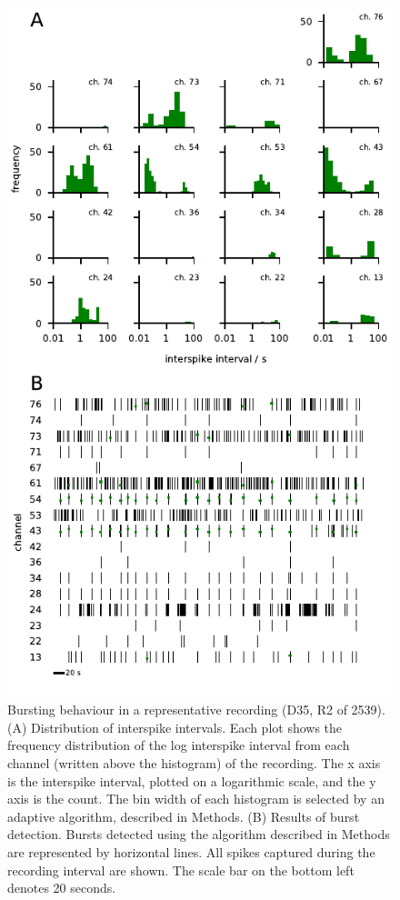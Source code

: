 \documentclass[doublespacing]{bmcart}
\begin{document}
\begin{backmatter}
\begin{figure}[h!]
  \includegraphics{../plots/supplementary_figures/isi_and_burst_example.pdf}
	\caption{Bursting behaviour in a representative recording (D35, R2 of 2539). (A) Distribution of interspike intervals. Each plot shows the frequency distribution of the log interspike interval from each channel (written above the histogram) of the recording.  The x axis is the interspike interval, plotted on a logarithmic scale, and the y axis is the count. The bin width of each histogram is selected by an adaptive algorithm, described in Methods. (B) Results of burst detection. Bursts detected using the algorithm described in Methods are represented by horizontal lines. All spikes captured during the recording interval are shown. The scale bar on the bottom left denotes 20 seconds.}
	\label{fig:logisi}
\end{figure}


\end{backmatter}
\end{document}
